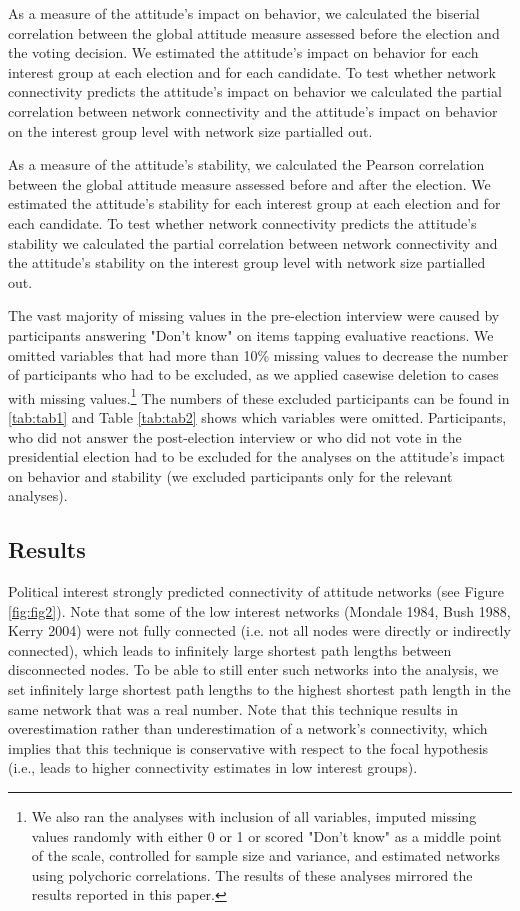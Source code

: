 \documentclass[10pt]{article}
\begin{document}
\begin{multicols}{2}

As a measure of the attitude's impact on behavior, we calculated the biserial correlation between the global attitude measure assessed before the election and the voting decision. We estimated the attitude's impact on behavior for each interest group at each election and for each candidate. To test whether network connectivity predicts the attitude's impact on behavior we calculated the partial correlation between network connectivity and the attitude's impact on behavior on the interest group level with network size partialled out.\par
As a measure of the attitude's stability, we calculated the Pearson correlation between the global attitude measure assessed before and after the election. We estimated the attitude's stability for each interest group at each election and for each candidate. To test whether network connectivity predicts the attitude's stability we calculated the partial correlation between network connectivity and the attitude's stability on the interest group level with network size partialled out.\par
The vast majority of missing values in the pre-election interview were caused by participants answering "Don't know" on items tapping evaluative reactions. We omitted variables that had more than 10\% missing values to decrease the number of participants who had to be excluded, as we applied casewise deletion to cases with missing values.\footnote{We also ran the analyses with inclusion of all variables, imputed missing values randomly with either 0 or 1 or scored "Don't know" as a middle point of the scale, controlled for sample size and variance, and estimated networks using polychoric correlations. The results of these analyses mirrored the results reported in this paper.}  The numbers of these excluded participants can be found in \ref{tab:tab1} and Table \ref{tab:tab2} shows which variables were omitted. Participants, who did not answer the post-election interview or who did not vote in the presidential election had to be excluded for the analyses on the attitude's impact on behavior and stability (we excluded participants only for the relevant analyses). 
\subsection*{Results}
Political interest strongly predicted connectivity of attitude networks (see Figure \ref{fig:fig2}). Note that some of the low interest networks (Mondale 1984, Bush 1988, Kerry 2004) were not fully connected (i.e. not all nodes were directly or indirectly connected), which leads to infinitely large shortest path lengths between disconnected nodes. To be able to still enter such networks into the analysis, we set infinitely large shortest path lengths to the highest shortest path length in the same network that was a real number. Note that this technique results in overestimation rather than underestimation of a network's connectivity, which implies that this technique is conservative with respect to the focal hypothesis (i.e., leads to higher connectivity estimates in low interest groups).\par


\end{multicols}
\end{document}
